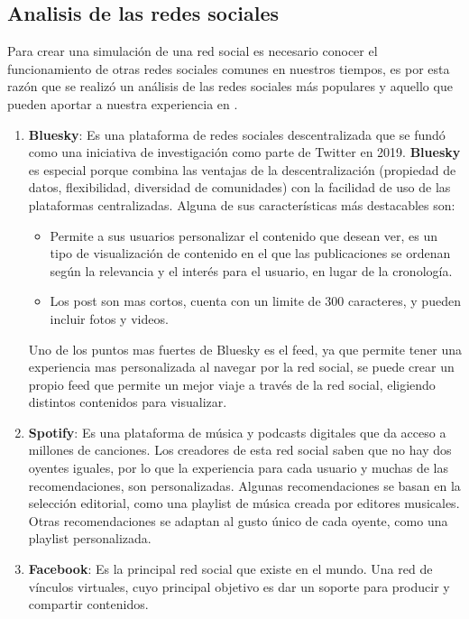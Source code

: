 \subsection{Analisis de las redes sociales}
Para crear una simulación de una red social es necesario conocer el funcionamiento de otras redes sociales comunes en nuestros tiempos, es por esta razón que se realizó un análisis de las redes sociales más populares y aquello que pueden aportar a nuestra experiencia en \loopweb.
\begin{enumerate}
    \item \textbf{Bluesky}: Es una plataforma de redes sociales descentralizada que se fundó como una iniciativa de investigación como parte de Twitter en 2019. \textbf{Bluesky} es especial porque combina las ventajas de la descentralización (propiedad de datos, flexibilidad, diversidad de comunidades) con la facilidad de uso de las plataformas centralizadas. Alguna de sus características más destacables son:
        \begin{itemize}
            \item Permite a sus usuarios personalizar el contenido que desean ver, es un tipo de visualización de contenido en el que las publicaciones se ordenan según la relevancia y el interés para el usuario, en lugar de la cronología.
            \item Los post son mas cortos, cuenta con un limite de $300$ caracteres, y pueden incluir fotos y videos.
        \end{itemize}
    Uno de los puntos mas fuertes de Bluesky es el feed, ya que permite tener una experiencia mas personalizada al navegar por la red social, se puede crear un propio feed que permite un mejor viaje a través de la red social, eligiendo distintos contenidos para visualizar.

    \item \textbf{Spotify}: Es una plataforma de música y podcasts digitales que da acceso a millones de canciones. Los creadores de esta red social saben que no hay dos oyentes iguales, por lo que la experiencia para cada usuario y muchas de las recomendaciones, son personalizadas.
    Algunas recomendaciones se basan en la selección editorial, como una playlist de música creada por editores musicales. Otras recomendaciones se adaptan al gusto único de cada oyente, como una playlist personalizada.

    \item \textbf{Facebook}: Es la principal red social que existe en el mundo. Una red de vínculos virtuales, cuyo principal objetivo es dar un soporte para producir y compartir contenidos.


\end{enumerate}
